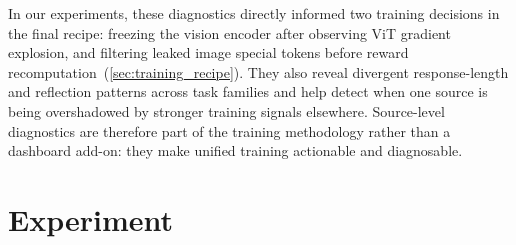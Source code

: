 In our experiments, these diagnostics directly informed two training decisions in the final recipe: freezing the vision encoder after observing ViT gradient explosion, and filtering leaked image special tokens before reward recomputation~(\cref{sec:training_recipe}).
%
They also reveal divergent response-length and reflection patterns across task families and help detect when one source is being overshadowed by stronger training signals elsewhere.
%
Source-level diagnostics are therefore part of the training methodology rather than a dashboard add-on: they make unified training actionable and diagnosable.

\section{Experiment}
\label{sec:experiment}

